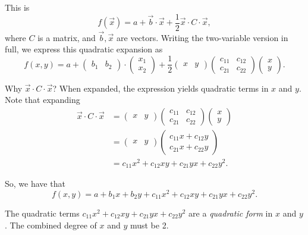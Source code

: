 \documentclass[a4paper, 12pt,oneside,openany]{book}
\begin{document}
This is $$f(\vec{x}) = a + \vec{b} \cdot \vec{x} + \frac{1}{2} \vec{x} \cdot C \cdot \vec{x},$$ where $C$ is a matrix, and $\vec{b}, \vec{x}$ are vectors. Writing the two-variable version in full, we express this quadratic expansion as $$f(x, y) = a + \begin{pmatrix} b_1 & b_2 \end{pmatrix} \cdot \begin{pmatrix} x_1 \\ x_2 \end{pmatrix} + \frac{1}{2} \begin{pmatrix} x & y \end{pmatrix}  \begin{pmatrix} c_{11} & c_{12} \\ c_{21} & c_{22} \end{pmatrix} \begin{pmatrix} x \\ y \end{pmatrix}.$$


Why $\vec{x} \cdot C \cdot \vec{x}$? When expanded, the expression yields quadratic terms in $x$ and $y$. Note that expanding \begin{align*} \vec{x} \cdot C \cdot \vec{x} &= \begin{pmatrix} x & y \end{pmatrix}\begin{pmatrix} c_{11} & c_{12} \\ c_{21}& c_{22} \end{pmatrix} \begin{pmatrix} x \\ y \end{pmatrix} \\ &= \begin{pmatrix} x & y \end{pmatrix} \begin{pmatrix} c_{11}x+c_{12}y \\ c_{21}x+c_{22}y \end{pmatrix} \\ &= c_{11}x^2+c_{12}xy+c_{21}yx+c_{22}y^2 . \end{align*} 

So, we have that $$f(x, y) = a + b_1x+b_2y+c_{11}x^2+c_{12}xy+c_{21}yx+c_{22}y^2.$$

The quadratic terms $c_{11}x^2+c_{12}xy+c_{21}yx+c_{22}y^2$ are a \emph{quadratic form} in $x$ and $y$. The combined degree of $x$ and $y$ must be 2.
\end{document}
